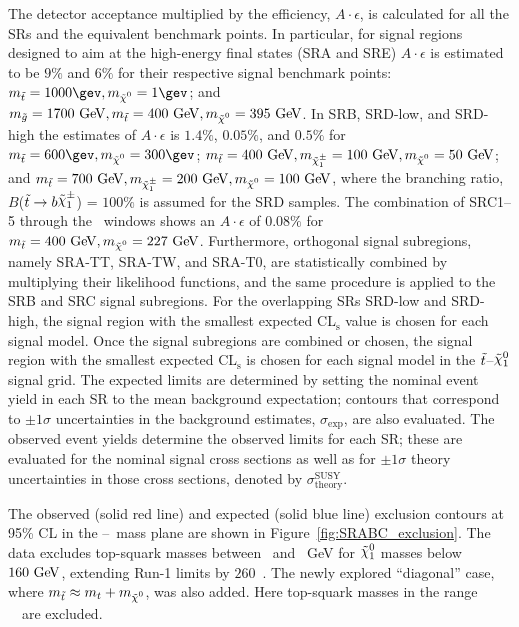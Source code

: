 			The detector acceptance multiplied by the efficiency, $A\cdot\epsilon$, is calculated for all the \acp{SR} and the equivalent benchmark points. In particular, for signal regions designed to aim at the high-energy final states (SRA and SRE) $A\cdot\epsilon$ is estimated to be $9\%$ and $6\%$ for their respective signal benchmark points: $\mstop=1000\gev,\mLSP=1\gev$; and $m_{\gluino} = 1700\GeV, \mstop=400\GeV, \mLSP=395\GeV$. In SRB, SRD-low, and SRD-high the estimates of $A\cdot \epsilon$ is $1.4\%$, $0.05\%$, and 0$.5\%$ for $\mstop=600\gev,\mLSP=300\gev$; $\mstop =400\GeV, m_{\chinoonepm}=100\GeV, \mLSP=50\GeV$; and $\mstop =700\GeV, m_{\chinoonepm}=200\GeV, \mLSP=100\GeV$, where the branching ratio, $B$($\stop\to b \chinoonepm$) = $100\%$ is assumed for the SRD samples. The combination of SRC1--5 through the \rISR\ windows shows an $A\cdot\epsilon$ of $0.08\%$ for $\mstop= 400\GeV, \mLSP=227\GeV$. Furthermore, orthogonal signal subregions, namely SRA-TT, SRA-TW, and SRA-T0, are statistically combined by multiplying their likelihood functions, and the same procedure is applied to the SRB and SRC signal subregions. For the overlapping \acp{SR} SRD-low and SRD-high, the signal region with the smallest expected CL$_\mathrm{s}$ value is chosen for each signal model. Once the signal subregions are combined or chosen, the signal region with the smallest expected CL$_\mathrm{s}$ is chosen for each signal model in the $\tilde{t}$--$\ninoone$ signal grid. The expected limits are determined by setting the nominal event yield in each \ac{SR} to the mean background expectation; contours that correspond to $\pm1\sigma$ uncertainties in the background estimates, $\sigma_{\mathrm{exp}}$, are also evaluated. The observed event yields determine the observed limits for each SR; these are evaluated for the nominal signal cross sections as well as for $\pm1\sigma$ theory uncertainties in those cross sections, denoted by $\sigma^{\mathrm{SUSY}}_{\mathrm{theory}}$. 

			The observed (solid red line) and expected (solid blue line) exclusion contours at 95\% CL in the \stop--\ninoone\ mass plane are shown in Figure~\ref{fig:SRABC_exclusion}. The data excludes top-squark masses between \stopLimLowLSPLow\ and \stopLimLowLSPHigh\ GeV for $\ninoone$ masses below $160\GeV$, extending Run-1 limits by $260$~\GeV. The newly explored ``diagonal'' case, where $\mstop\approx m_t+\mLSP$, was also added. Here top-squark masses in the range \stopLimDiag\ \GeV\ are excluded. 

